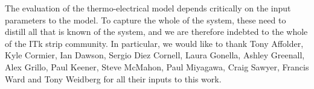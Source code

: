 The evaluation of the thermo-electrical model depends critically on the input parameters to the model. To capture the whole of the system, these need to distill all that is known of the system, and we are therefore indebted to the whole of the ITk strip community. In particular, we would like to thank Tony Affolder, Kyle Cormier, Ian Dawson, Sergio Diez Cornell, Laura Gonella, Ashley Greenall, Alex Grillo, Paul Keener, Steve McMahon, Paul Miyagawa, Craig Sawyer, Francis Ward and Tony Weidberg for all their inputs to this work.
